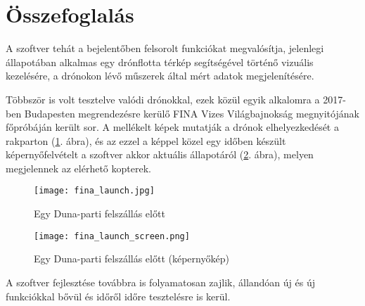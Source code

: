 \section{Összefoglalás}

A szoftver tehát a bejelentőben felsorolt funkciókat megvalósítja, jelenlegi
állapotában alkalmas egy drónflotta térkép segítségével történő vizuális
kezelésére, a drónokon lévő műszerek által mért adatok megjelenítésére.

Többször is volt tesztelve valódi drónokkal, ezek közül egyik alkalomra a
2017-ben Budapesten megrendezésre kerülő FINA Vizes Világbajnokság megnyitójának
főpróbáján került sor. A mellékelt képek mutatják a drónok elhelyezkedését a
rakparton (\ref{fig:fina_launch}. ábra), és az ezzel a képpel közel egy időben készült
képernyőfelvételt a szoftver akkor aktuális állapotáról
(\ref{fig:fina_launch_screen}. ábra), melyen megjelennek az elérhető kopterek.

\begin{figure}[H]
  \texttt{[image: fina\_launch.jpg]}
  \caption{Egy Duna-parti felszállás előtt}
  \label{fig:fina_launch}
\end{figure}

\begin{figure}[H]
  \texttt{[image: fina\_launch\_screen.png]}
  \caption{Egy Duna-parti felszállás előtt (képernyőkép)}
  \label{fig:fina_launch_screen}
\end{figure}

A szoftver fejlesztése továbbra is folyamatosan zajlik, állandóan új és új
funkciókkal bővül és időről időre tesztelésre is kerül.
